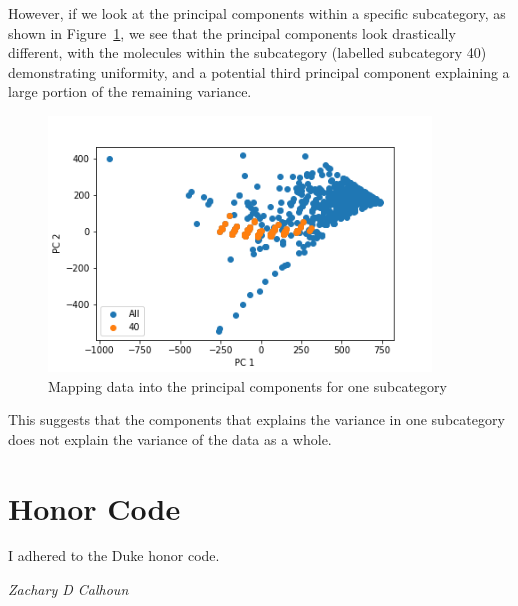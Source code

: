 \documentclass[12pt, oneside]{article}   	%
\begin{document}
However, if we look at the principal components within a specific subcategory, as shown in Figure~\ref{fig:pc2}, we see that the principal components look drastically different, with the molecules within the subcategory (labelled subcategory 40) demonstrating uniformity, and a potential third principal component explaining a large portion of the remaining variance.

\begin{figure}[!h] %
   \centering
   \includegraphics[width=4in]{PCA_subcat40.png} 
   \caption{Mapping data into the principal components for one subcategory}
   \label{fig:pc2}
\end{figure}

This suggests that the components that explains the variance in one subcategory does not explain the variance of the data as a whole. 

\section{Honor Code}
I adhered to the Duke honor code.

\emph{Zachary D Calhoun}
\end{document}
